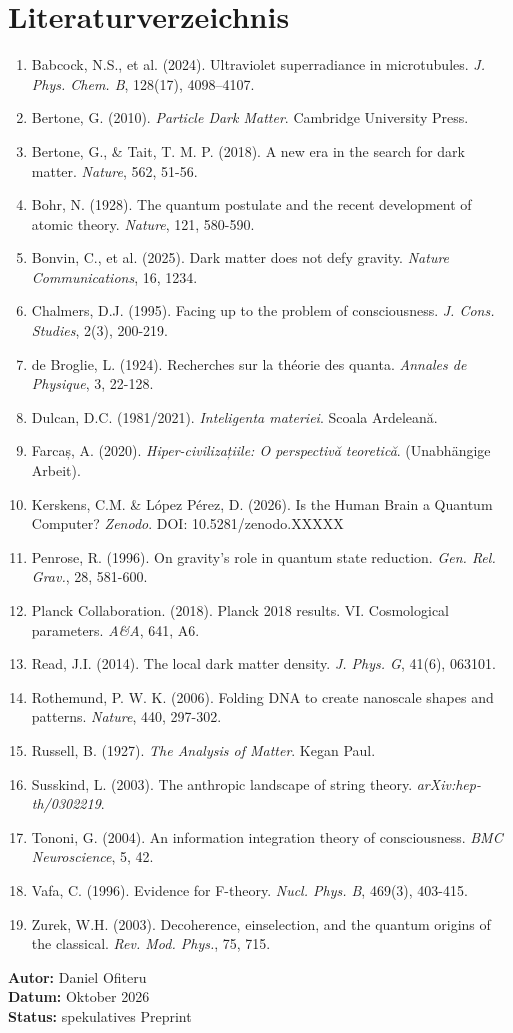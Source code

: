 \section*{Literaturverzeichnis}
\begin{enumerate}
    \item Babcock, N.S., et al. (2024). Ultraviolet superradiance in microtubules. \textit{J. Phys. Chem. B}, 128(17), 4098--4107.
    \item Bertone, G. (2010). \textit{Particle Dark Matter}. Cambridge University Press.
    \item Bertone, G., \& Tait, T. M. P. (2018). A new era in the search for dark matter. \textit{Nature}, 562, 51-56.
    \item Bohr, N. (1928). The quantum postulate and the recent development of atomic theory. \textit{Nature}, 121, 580-590.
    \item Bonvin, C., et al. (2025). Dark matter does not defy gravity. \textit{Nature Communications}, 16, 1234.
    \item Chalmers, D.J. (1995). Facing up to the problem of consciousness. \textit{J. Cons. Studies}, 2(3), 200-219.
    \item de Broglie, L. (1924). Recherches sur la théorie des quanta. \textit{Annales de Physique}, 3, 22-128.
    \item Dulcan, D.C. (1981/2021). \textit{Inteligenta materiei}. Scoala Ardeleană.
    \item Farcaș, A. (2020). \textit{Hiper-civilizațiile: O perspectivă teoretică}. (Unabhängige Arbeit).
    \item Kerskens, C.M. \& López Pérez, D. (2026). Is the Human Brain a Quantum Computer? \textit{Zenodo}. DOI: 10.5281/zenodo.XXXXX
    \item Penrose, R. (1996). On gravity's role in quantum state reduction. \textit{Gen. Rel. Grav.}, 28, 581-600.
    \item Planck Collaboration. (2018). Planck 2018 results. VI. Cosmological parameters. \textit{A\&A}, 641, A6.
    \item Read, J.I. (2014). The local dark matter density. \textit{J. Phys. G}, 41(6), 063101.
    \item Rothemund, P. W. K. (2006). Folding DNA to create nanoscale shapes and patterns. \textit{Nature}, 440, 297-302.
    \item Russell, B. (1927). \textit{The Analysis of Matter}. Kegan Paul.
    \item Susskind, L. (2003). The anthropic landscape of string theory. \textit{arXiv:hep-th/0302219}.
    \item Tononi, G. (2004). An information integration theory of consciousness. \textit{BMC Neuroscience}, 5, 42.
    \item Vafa, C. (1996). Evidence for F-theory. \textit{Nucl. Phys. B}, 469(3), 403-415.
    \item Zurek, W.H. (2003). Decoherence, einselection, and the quantum origins of the classical. \textit{Rev. Mod. Phys.}, 75, 715.
\end{enumerate}

\vspace{1cm}
\begin{flushright}
\textbf{Autor:} Daniel Ofiteru \\
\textbf{Datum:} Oktober 2026 \\
\textbf{Status:} spekulatives Preprint
\end{flushright}


